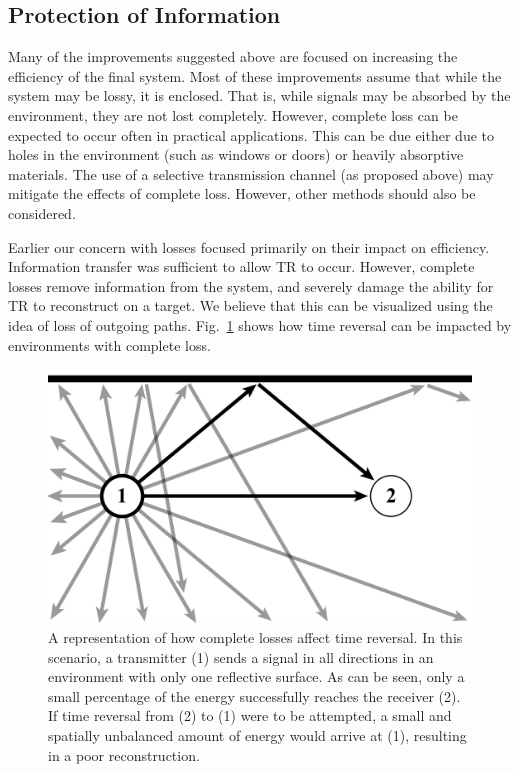 \subsection{Protection of Information}

Many of the improvements suggested above are focused on increasing the efficiency of the final system. Most of these improvements assume that while the system may be lossy, it is enclosed. That is, while signals may be absorbed by the environment, they are not lost completely. However, complete loss can be expected to occur often in practical applications. This can be due either due to holes in the environment (such as windows or doors) or heavily absorptive materials. The use of a selective transmission channel (as proposed above) may mitigate the effects of complete loss.  However, other methods should also be considered.

Earlier our concern with losses focused primarily on their impact on efficiency. Information transfer was sufficient to allow TR to occur. However, complete losses remove information from the system, and severely damage the ability for TR to reconstruct on a target. We believe that this can be visualized using the idea of loss of outgoing paths. Fig.~\ref{fig:outgoing} shows how time reversal can be impacted by environments with complete loss.

\begin{figure}[h]
\includegraphics[width=\columnwidth]{figs/future/outgoing}
\caption[Example of information loss on time reversal efficacy]{A representation of how complete losses affect time reversal. In this scenario, a transmitter (1) sends a signal in all directions in an environment with only one reflective surface. As can be seen, only a small percentage of the energy successfully reaches the receiver (2). If time reversal from (2) to (1) were to be attempted, a small and spatially unbalanced amount of energy would arrive at (1), resulting in a poor reconstruction.}
\label{fig:outgoing}
\end{figure}


